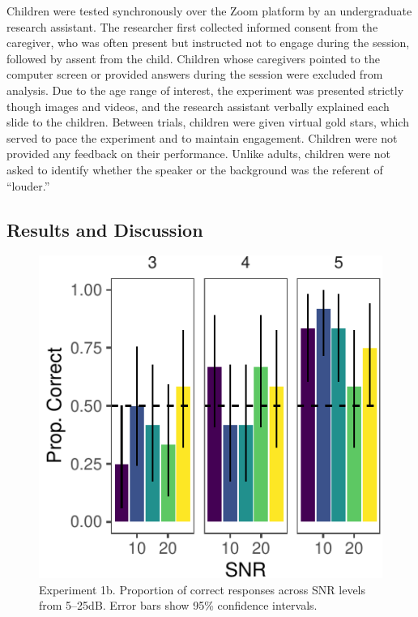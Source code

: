 \documentclass[10pt, letterpaper]{article}
\newenvironment{CodeChunk}{}{}
\begin{document}
Children were tested synchronously over the Zoom platform by an
undergraduate research assistant. The researcher first collected
informed consent from the caregiver, who was often present but
instructed not to engage during the session, followed by assent from the
child. Children whose caregivers pointed to the computer screen or
provided answers during the session were excluded from analysis. Due to
the age range of interest, the experiment was presented strictly though
images and videos, and the research assistant verbally explained each
slide to the children. Between trials, children were given virtual gold
stars, which served to pace the experiment and to maintain engagement.
Children were not provided any feedback on their performance. Unlike
adults, children were not asked to identify whether the speaker or the
background was the referent of ``louder.''

\hypertarget{results-and-discussion-1}{%
\subsection{Results and Discussion}\label{results-and-discussion-1}}

\begin{CodeChunk}
\begin{figure}[t]

{\centering \includegraphics{figs/e1b-bar-1} 

}

\caption[Experiment 1b]{Experiment 1b. Proportion of correct responses across SNR levels from 5--25dB. Error bars show 95\% confidence intervals.}\label{fig:e1b-bar}
\end{figure}
\end{CodeChunk}
\end{document}
